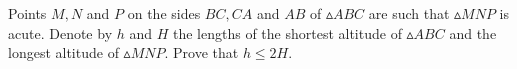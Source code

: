 Points $M,N$ and $P$ on the sides $BC, CA$ and $AB$ of  $\vartriangle  ABC$ are such that $\vartriangle MNP$ is acute. Denote by $h$ and $H$ the lengths of the shortest altitude of $\vartriangle ABC$ and the longest altitude of $\vartriangle MNP$. Prove that $h  \le 2H$.